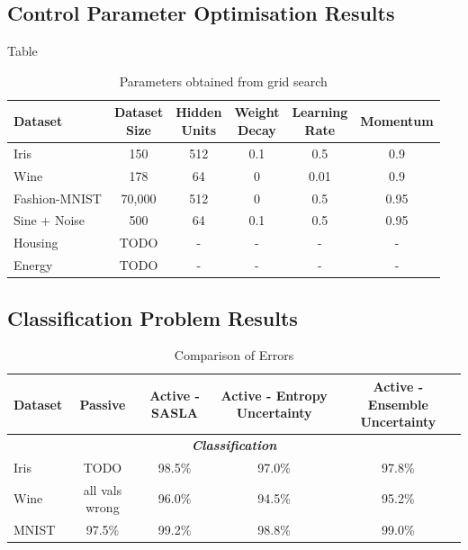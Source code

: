 \documentclass[10pt, conference]{IEEEtran}
\begin{document}
\subsection{Control Parameter Optimisation Results}
Table 
\begin{table}[htbp]
	\centering
	\caption{Parameters obtained from grid search}
	\begin{tabular}{|l|c|c|c|c|c|}
		\hline
		\textbf{Dataset} & \makecell{\textbf{Dataset} \\ \textbf{Size}} & \makecell{\textbf{Hidden} \\ \textbf{Units}} & \makecell{\textbf{Weight} \\ \textbf{Decay}} & \makecell{\textbf{Learning} \\ \textbf{Rate}} & \textbf{Momentum} \\
		\hline
		Iris & 150 & 512 & 0.1 & 0.5 & 0.9 \\
		Wine & 178 & 64 & 0 & 0.01 & 0.9 \\
		Fashion-MNIST & 70,000 & 512 & 0 & 0.5 & 0.95 \\
		\hline
		Sine + Noise & 500 & 64 & 0.1 & 0.5 & 0.95 \\
		Housing & TODO & - & - & - & - \\
		Energy & TODO & - & - & - & - \\
		\hline
	\end{tabular}
	\label{tab:datasets}
\end{table}






\subsection{Classification Problem Results}
\begin{table}[ht]
	\caption{Comparison of Errors}
	\label{tab:comparison}
	\centering
	\begin{tabular}{|l|c|c|c|c|}
		\hline
		\textbf{Dataset} & \textbf{Passive} & \textbf{Active - SASLA} & \textbf{Active - Entropy Uncertainty} & \textbf{Active - Ensemble Uncertainty} \\
		\hline
		\multicolumn{5}{|c|}{\textbf{\textit{Classification}}} \\
		\hline
		Iris & TODO & 98.5\% & 97.0\% & 97.8\% \\
		Wine & all vals wrong & 96.0\% & 94.5\% & 95.2\% \\
		MNIST & 97.5\% & 99.2\% & 98.8\% & 99.0\% \\
		\hline
	\end{tabular}
\end{table}
\end{document}
